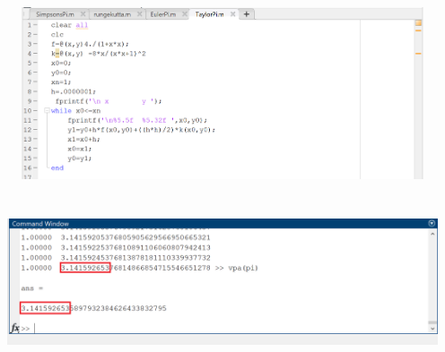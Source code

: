\documentclass[letterpaper,12pt]{article}
\begin{document}
\begin{center}
    \includegraphics[width=5in, height=2in]{TaylorCode.png}
\end{center}
\begin{center}
    \includegraphics[width=5in, height=2in]{TaylorResult.png}
\end{center}
 
\end{document}
